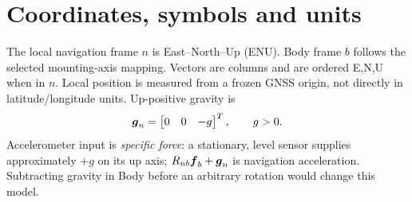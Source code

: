 \section{Coordinates, symbols and units}
\label{sec:conventions}
The local navigation frame $n$ is East--North--Up (ENU). Body frame $b$ follows the selected mounting-axis mapping. Vectors are columns and are ordered E,N,U when in $n$. Local position is measured from a frozen GNSS origin, not directly in latitude/longitude units. Up-positive gravity is
\begin{equation}
\boldsymbol{g}_n=\begin{bmatrix}0&0&-g\end{bmatrix}^{T},\qquad g>0.
\label{eq:gravity}
\end{equation}
Accelerometer input is \emph{specific force}: a stationary, level sensor supplies approximately $+g$ on its up axis; $R_{nb}\boldsymbol{f}_b+\boldsymbol{g}_n$ is navigation acceleration. Subtracting gravity in Body before an arbitrary rotation would change this model.

